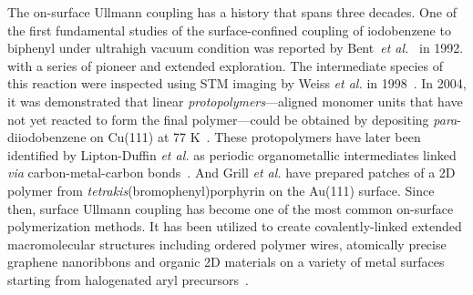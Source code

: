 \documentclass[%
 reprint,
 amsmath,amssymb,
 aps,
prb,
floatfix,
]{revtex4-2}
\begin{document}
{The on-surface Ullmann coupling has a history that spans three decades. One of the first fundamental studies of the surface-confined coupling of iodobenzene to biphenyl under ultrahigh vacuum condition was reported by Bent~\textit{et al.}~\cite{sur_sci01} in 1992. with a series of pioneer and extended exploration\cite{ullmann_127, ullmann_128, ullmann_129, ullmann_87}.
%
The intermediate species of this reaction were inspected using STM imaging by Weiss \textit{et al.} in 1998~\cite{langm01}. 
In 2004, it was demonstrated that linear \emph{protopolymers}---aligned monomer units that have not yet reacted to form the final polymer---could be obtained by depositing \textit{para}-diiodobenzene on Cu(111) at 77 K~\cite{jacs01}. 
%
These protopolymers have later been identified by Lipton-Duffin \textit{et al.} as periodic organometallic intermediates linked \textit{via} carbon-metal-carbon bonds~\cite{ullmann_88}.
And Grill \textit{et al.} have prepared patches of a 2D polymer from \textit{tetrakis}(bromophenyl)porphyrin on the Au(111) surface.
%
Since then, surface Ullmann coupling has become one of the most common on-surface polymerization methods. It has been utilized to create covalently-linked extended macromolecular structures including ordered polymer wires, atomically precise graphene nanoribbons and organic 2D materials on a variety of metal surfaces starting from halogenated aryl precursors~\cite{ullmann_33,ullmann_34, ullmann_42, ullmann_43, ullmann_45, ullmann_46, ullmann_47, ullmann_48}. 

}

\end{document}
